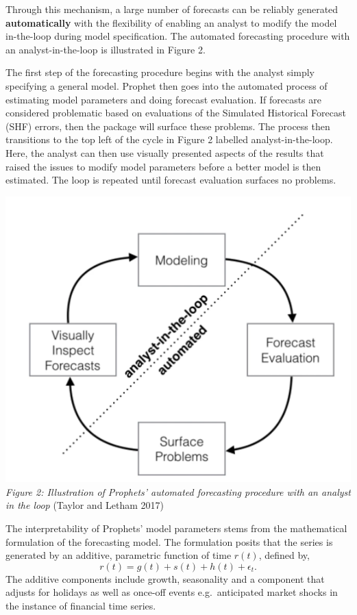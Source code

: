 \documentclass[12pt,a4paper]{article}
\numberwithin{equation}{section}
\numberwithin{figure}{section}
\numberwithin{table}{section}
\begin{document}
Through this mechanism, a large number of forecasts can be reliably
generated \textbf{automatically} with the flexibility of enabling an
analyst to modify the model in-the-loop during model specification. The
automated forecasting procedure with an analyst-in-the-loop is
illustrated in Figure 2.

The first step of the forecasting procedure begins with the analyst
simply specifying a general model. Prophet then goes into the automated
process of estimating model parameters and doing forecast evaluation. If
forecasts are considered problematic based on evaluations of the
Simulated Historical Forecast (SHF) errors, then the package will
surface these problems. The process then transitions to the top left of
the cycle in Figure 2 labelled analyst-in-the-loop. Here, the analyst
can then use visually presented aspects of the results that raised the
issues to modify model parameters before a better model is then
estimated. The loop is repeated until forecast evaluation surfaces no
problems.

\includegraphics[width=1.00000\textwidth]{analyst in the loop.png}\\
\emph{Figure 2: Illustration of Prophets' automated forecasting
procedure with an analyst in the loop} (Taylor and Letham 2017)

The interpretability of Prophets' model parameters stems from the
mathematical formulation of the forecasting model. The formulation
posits that the series is generated by an additive, parametric function
of time \(r(t)\), defined by,
\[ r(t) = g(t) + s(t) +  h(t) + \epsilon_t.\] The additive components
include growth, seasonality and a component that adjusts for holidays as
well as once-off events e.g.~anticipated market shocks in the instance
of financial time series.
\end{document}
